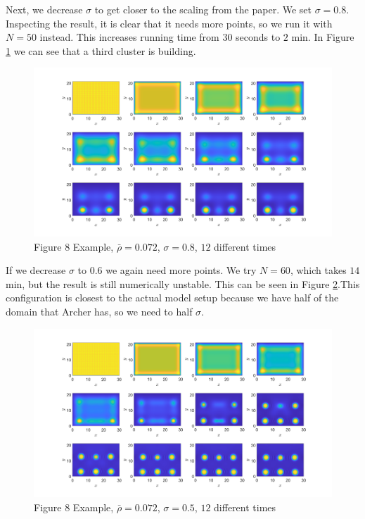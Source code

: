 \documentclass[11pt, a4paper]{article}
\theoremstyle{definition}
\begin{document}
Next, we decrease $\sigma$ to get closer to the scaling from the paper. We set $\sigma = 0.8$. Inspecting the result, it is clear that it needs more points, so we run it with $N = 50$ instead. This increases running time from $30$ seconds to $2$ min. In Figure \ref{F2} we can see that a third cluster is building. 
\begin{figure}[h]
	\centering
	\includegraphics[scale=0.25]{Ex8F2.png}
	\caption{Figure 8 Example, $\bar \rho = 0.072$, $\sigma = 0.8$, $12$ different times} 
	\label{F2}
\end{figure} 
If we decrease $\sigma$ to $0.6$ we again need more points. We try $N = 60$, which takes $14$ min, but the result is still numerically unstable. This can be seen in Figure \ref{F3}.This configuration is closest to the actual model setup because we have half of the domain that Archer has, so we need to half $\sigma$.
\begin{figure}[h]
	\centering
	\includegraphics[scale=0.25]{Ex8F3.png}
	\caption{Figure 8 Example, $\bar \rho = 0.072$, $\sigma = 0.5$, $12$ different times} 
	\label{F3}
\end{figure} 
\end{document}
